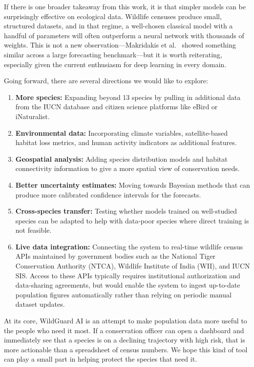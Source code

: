 \documentclass[conference]{IEEEtran}
\begin{document}
If there is one broader takeaway from this work, it is that simpler models can be surprisingly effective on ecological data. Wildlife censuses produce small, structured datasets, and in that regime, a well-chosen classical model with a handful of parameters will often outperform a neural network with thousands of weights. This is not a new observation---Makridakis et al.~\cite{makridakis2018} showed something similar across a large forecasting benchmark---but it is worth reiterating, especially given the current enthusiasm for deep learning in every domain.

Going forward, there are several directions we would like to explore:
\begin{enumerate}
\item \textbf{More species:} Expanding beyond 13 species by pulling in additional data from the IUCN database and citizen science platforms like eBird or iNaturalist.
\item \textbf{Environmental data:} Incorporating climate variables, satellite-based habitat loss metrics, and human activity indicators as additional features.
\item \textbf{Geospatial analysis:} Adding species distribution models and habitat connectivity information to give a more spatial view of conservation needs.
\item \textbf{Better uncertainty estimates:} Moving towards Bayesian methods that can produce more calibrated confidence intervals for the forecasts.
\item \textbf{Cross-species transfer:} Testing whether models trained on well-studied species can be adapted to help with data-poor species where direct training is not feasible.
\item \textbf{Live data integration:} Connecting the system to real-time wildlife census APIs maintained by government bodies such as the National Tiger Conservation Authority (NTCA), Wildlife Institute of India (WII), and IUCN SIS. Access to these APIs typically requires institutional authorization and data-sharing agreements, but would enable the system to ingest up-to-date population figures automatically rather than relying on periodic manual dataset updates.
\end{enumerate}

At its core, WildGuard AI is an attempt to make population data more useful to the people who need it most. If a conservation officer can open a dashboard and immediately see that a species is on a declining trajectory with high risk, that is more actionable than a spreadsheet of census numbers. We hope this kind of tool can play a small part in helping protect the species that need it.
\end{document}
